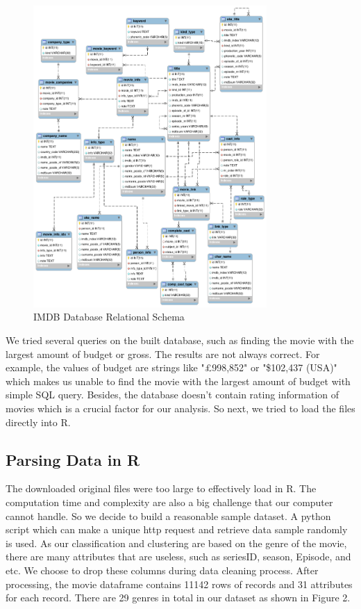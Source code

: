 \documentclass[conference]{IEEEtran}
\begin{document}
\begin{figure}
	\centering
	\includegraphics[width=3.5in]{ERgraph.png}
	\caption{IMDB Database Relational Schema}
	\label{fig:side:a}
\end{figure}

We tried several queries on the built database, such as finding the movie with the largest amount of budget or gross. The results are not always correct. For example, the values of budget are strings like "\pounds 998,852" or "\$102,437 (USA)" which makes us unable to find the movie with the largest amount of budget with simple SQL query. Besides, the database doesn't contain rating information of movies which is a crucial factor for our analysis. So next, we tried to load the files directly into R.

\subsection{Parsing Data in R}

The downloaded original files were too large to effectively load in R. The computation time and complexity are also a big challenge that our computer cannot handle. So we decide to build a reasonable sample dataset. A python script which can make a unique http request and retrieve data sample randomly is used. As our classification and clustering are based on the genre of the movie, there are many attributes that are useless, such as seriesID, season, Episode, and etc. We choose to drop these columns during data cleaning process. After processing, the movie dataframe contains 11142 rows of records and 31 attributes for each record.  There are 29 genres in total in our dataset as shown in Figure 2.
\end{document}
